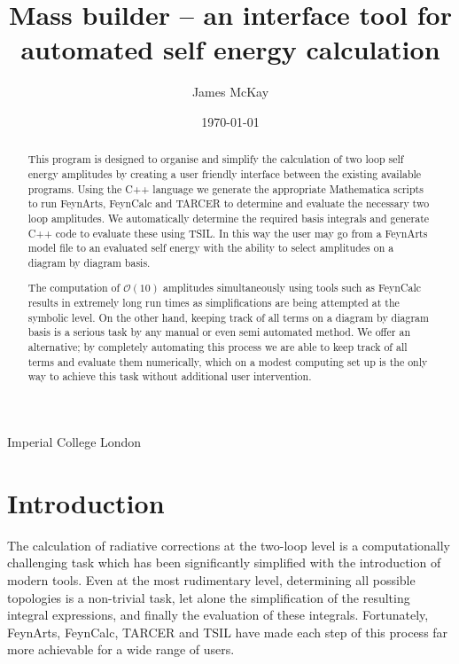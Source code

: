 



\def\A{\mathcal{A}}
\def\B{\mathcal{B}}
\def\C{\mathcal{C}}



\title{Mass builder -- an interface tool for automated self energy calculation}
%
\author
{
  James McKay
}
%
%
\institute
{
  Imperial College London\label{addr1}
}
%
\date{\today}

\maketitle

\begin{abstract}

This program is designed to organise and simplify the calculation of two loop self energy amplitudes by creating a user friendly interface between the existing available programs.  Using the C++ language we generate the appropriate Mathematica scripts to run FeynArts, FeynCalc and TARCER to determine and evaluate the necessary two loop amplitudes.  We automatically determine the required basis integrals and generate C++ code to evaluate these using TSIL.  In this way the user may go from a FeynArts model file to an evaluated self energy with the ability to select amplitudes on a diagram by diagram basis.

The computation of $\mathcal{O}(10)$ amplitudes simultaneously using tools such as FeynCalc results in extremely long run times as simplifications are being attempted at the symbolic level.  On the other hand, keeping track of all terms on a diagram by diagram basis is a serious task by any manual or even semi automated method.  We offer an alternative; by completely automating this process we are able to keep track of all terms and evaluate them numerically, which on a modest computing set up is the only way to achieve this task without additional user intervention.

\end{abstract}

\tableofcontents

\section{Introduction}

The calculation of radiative corrections at the two-loop level is a computationally challenging task which has been significantly simplified with the introduction of modern tools.  Even at the most rudimentary level, determining all possible topologies is a non-trivial task, let alone the simplification of the resulting integral expressions, and finally the evaluation of these integrals.  Fortunately, FeynArts, FeynCalc, TARCER and TSIL have made each step of this process far more achievable for a wide range of users.

